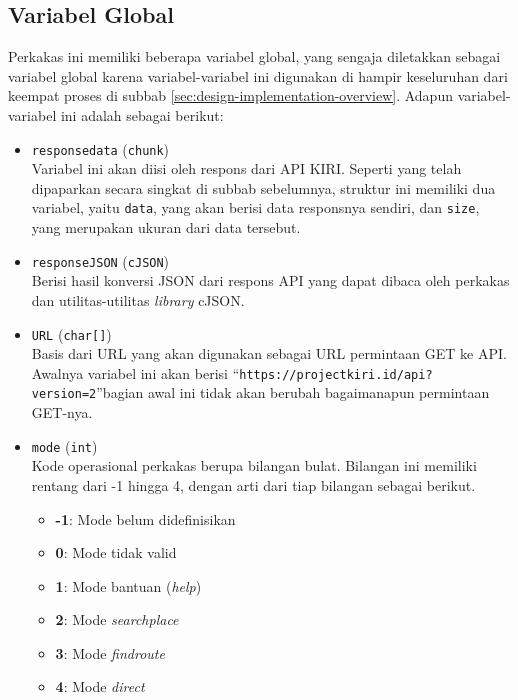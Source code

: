\subsection{Variabel Global}
\label{sec:design-implementation-globalvars}

Perkakas ini memiliki beberapa variabel global, yang sengaja diletakkan sebagai variabel global karena variabel-variabel ini digunakan di hampir keseluruhan dari keempat proses di subbab \ref{sec:design-implementation-overview}. Adapun variabel-variabel ini adalah sebagai berikut:

\begin{itemize}
	\item \verb|responsedata| (\verb|chunk|) \\
	Variabel ini akan diisi oleh respons dari API KIRI. Seperti yang telah dipaparkan secara singkat di subbab sebelumnya, struktur ini memiliki dua variabel, yaitu \verb|data|, yang akan berisi data responsnya sendiri, dan \verb|size|, yang merupakan ukuran dari data tersebut.
	\item \verb|responseJSON| (\verb|cJSON|) \\
	Berisi hasil konversi JSON dari respons API yang dapat dibaca oleh perkakas dan utilitas-utilitas \textit{library} cJSON.
	\item \verb|URL| (\verb|char[]|) \\
	Basis dari URL yang akan digunakan sebagai URL permintaan GET ke API. Awalnya variabel ini akan berisi ``\verb|https://projectkiri.id/api?version=2|''\textemdash bagian awal ini tidak akan berubah bagaimanapun permintaan GET-nya.
	\item \verb|mode| (\verb|int|) \\
	Kode operasional perkakas berupa bilangan bulat. Bilangan ini memiliki rentang dari -1 hingga 4, dengan arti dari tiap bilangan sebagai berikut.
	
	\begin{itemize}
		\item \textbf{-1}: Mode belum didefinisikan
		\item \textbf{0}: Mode tidak valid
		\item \textbf{1}: Mode bantuan (\textit{help})
		\item \textbf{2}: Mode \textit{searchplace}
		\item \textbf{3}: Mode \textit{findroute}
		\item \textbf{4}: Mode \textit{direct}
	\end{itemize}
	

\end{itemize}
